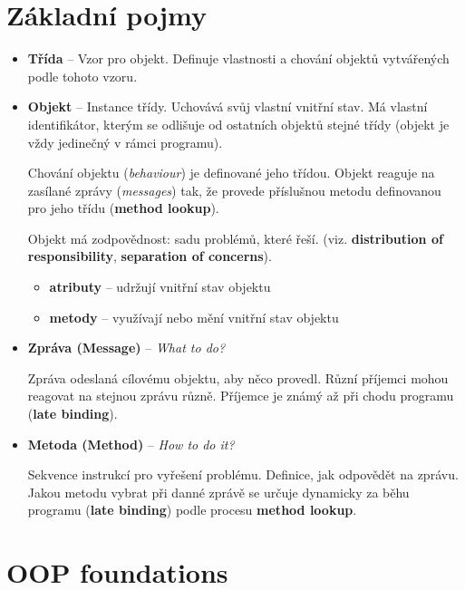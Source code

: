 \documentclass{szzclass}
\begin{document}
\tableofcontents
\newpage

\section{Základní pojmy}

\begin{itemize}
      \item \textbf{Třída} -- Vzor pro objekt. Definuje vlastnosti a chování objektů vytvářených podle tohoto vzoru.
      \item \textbf{Objekt} -- Instance třídy. Uchovává svůj vlastní vnitřní stav. Má vlastní identifikátor,
      kterým se odlišuje od ostatních objektů stejné třídy (objekt je vždy jedinečný v rámci programu).

      Chování objektu (\textit{behaviour}) je definované jeho třídou. Objekt reaguje na zasílané zprávy
      (\textit{messages}) tak, že provede příslušnou metodu definovanou pro jeho třídu (\textbf{method lookup}).

      Objekt má zodpovědnost: sadu problémů, které řeší. (viz. \textbf{distribution of responsibility}, \textbf{separation of concerns}).

      \begin{itemize}
            \item \textbf{atributy} -- udržují vnitřní stav objektu
            \item \textbf{metody} -- využívají nebo mění vnitřní stav objektu
      \end{itemize}

      \item \textbf{Zpráva (Message)} -- \textit{What to do?}

      Zpráva odeslaná cílovému objektu, aby něco provedl. Různí příjemci mohou reagovat na stejnou zprávu různě.
      Příjemce je známý až při chodu programu (\textbf{late binding}).

      \item \textbf{Metoda (Method)} -- \textit{How to do it?}

      Sekvence instrukcí pro vyřešení problému. Definice, jak odpovědět na zprávu.
      Jakou metodu vybrat při danné zprávě se určuje dynamicky za běhu programu (\textbf{late binding}) podle procesu \textbf{method lookup}.

\end{itemize}

\section{OOP foundations}
\end{document}
